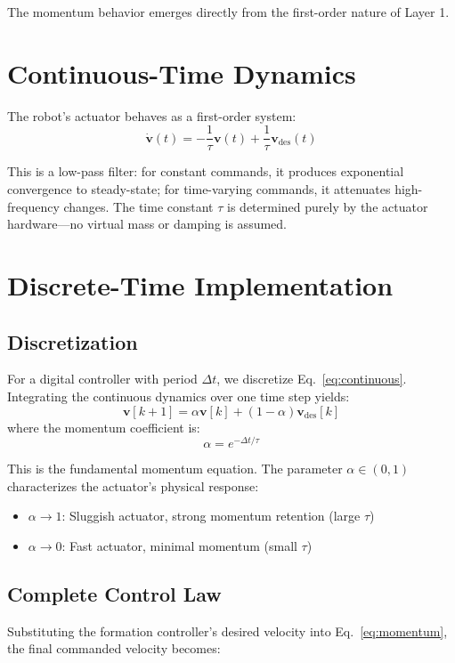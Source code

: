 \documentclass[11pt]{article}
\begin{document}
The momentum behavior emerges directly from the first-order nature of Layer 1.

\section{Continuous-Time Dynamics}

The robot's actuator behaves as a first-order system:
\begin{equation}
\dot{\mathbf{v}}(t) = -\frac{1}{\tau}\mathbf{v}(t) + \frac{1}{\tau}\mathbf{v}_{\text{des}}(t)
\label{eq:continuous}
\end{equation}

This is a low-pass filter: for constant commands, it produces exponential convergence to steady-state; for time-varying commands, it attenuates high-frequency changes. The time constant $\tau$ is determined purely by the actuator hardware—no virtual mass or damping is assumed.

\section{Discrete-Time Implementation}

\subsection{Discretization}
For a digital controller with period $\Delta t$, we discretize Eq.~\eqref{eq:continuous}. Integrating the continuous dynamics over one time step yields:
\begin{equation}
\mathbf{v}[k+1] = \alpha \mathbf{v}[k] + (1-\alpha)\mathbf{v}_{\text{des}}[k]
\label{eq:momentum}
\end{equation}
where the momentum coefficient is:
\begin{equation}
\alpha = e^{-\Delta t/\tau}
\end{equation}

This is the fundamental momentum equation. The parameter $\alpha \in (0,1)$ characterizes the actuator's physical response:
\begin{itemize}
    \item $\alpha \to 1$: Sluggish actuator, strong momentum retention (large $\tau$)
    \item $\alpha \to 0$: Fast actuator, minimal momentum (small $\tau$)
\end{itemize}

\subsection{Complete Control Law}
Substituting the formation controller's desired velocity into Eq.~\eqref{eq:momentum}, the final commanded velocity becomes:
\end{document}
